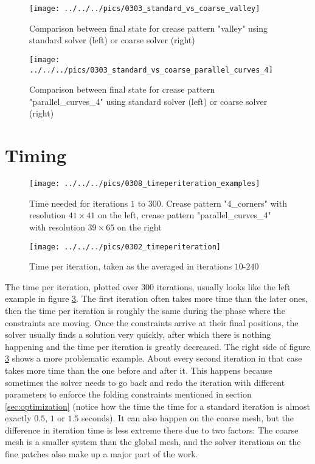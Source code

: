 \documentclass[a4paper,twoside,12pt,nochapterprefix]{scrbook}
\begin{document}
\begin{figure}
    \centering
    \texttt{[image: ../../../pics/0303\_standard\_vs\_coarse\_valley]}
    \caption{Comparison between final state for crease pattern "valley" using standard solver (left) or coarse solver (right)}
      \label{fig:results_compare_valley}
\end{figure}
\begin{figure}
    \centering
    \texttt{[image: ../../../pics/0303\_standard\_vs\_coarse\_parallel\_curves\_4]}
    \caption{Comparison between final state for crease pattern "parallel\_curves\_4" using standard solver (left) or coarse solver (right)}
      \label{fig:results_compare_curves}
\end{figure}
\section{Timing}
\begin{figure}
    \centering
    \texttt{[image: ../../../pics/0308\_timeperiteration\_examples]}
    \caption{Time needed for iterations $1$ to $300$. Crease pattern "4\_corners" with resolution $41 \times 41$ on the left, crease pattern "parallel\_curves\_4" with resolution $39 \times 65$ on the right}
    \label{fig:results_cornerstime}
\end{figure}
\begin{figure}
    \centering
    \texttt{[image: ../../../pics/0302\_timeperiteration]}
    \caption{Time per iteration, taken as the averaged in iterations $10$-$240$}
      \label{fig:results_timeperiteration}
\end{figure}
The time per iteration, plotted over $300$ iterations, usually looks like the left example in figure \ref{fig:results_cornerstime}. The first iteration often takes more time than the later ones, then the time per iteration is roughly the same during the phase where the constraints are moving. Once the constraints arrive at their final positions, the solver usually finds a solution very quickly, after which there is nothing happening and the time per iteration is greatly decreased.\newline
The right side of figure \ref{fig:results_cornerstime} shows a more problematic example. About every second iteration in that case takes more time than the one before and after it. This happens because sometimes the solver needs to go back and redo the iteration with different parameters to enforce the folding constraints mentioned in section \ref{sec:optimization} (notice how the time the time for a standard iteration is almost exactly $0.5$, $1$ or $1.5$ seconds). It can also happen on the coarse mesh, but the difference in iteration time is less extreme there due to two factors: The coarse mesh is a smaller system than the global mesh, and the solver iterations on the fine patches also make up a major part of the work.\newline
\end{document}

